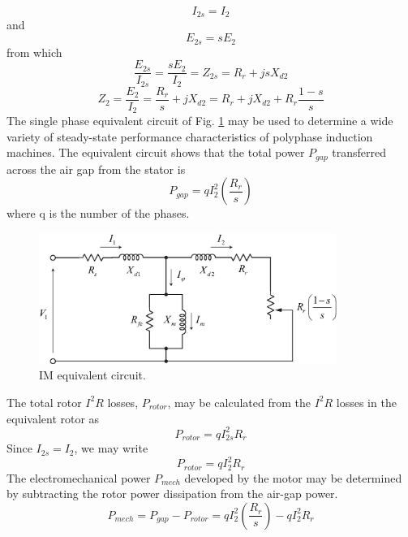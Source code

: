 \documentclass[11pt,a4paper,oneside]{book}
\numberwithin{equation}{section}
\theoremstyle{it}
\theoremstyle{definition}
\begin{document}
\begin{equation} \label{eq8}
	I_{2s} = I_{2}
\end{equation}
and
\begin{equation} \label{eq9}
	E_{2s} = sE_{2}
\end{equation}
from which
\begin{equation} \label{eq10}
	\frac{E_{2s}}{I_{2s}}=\frac{sE_2}{I_2}=Z_{2s}=R_r+jsX_{d2}
\end{equation}
\begin{equation} \label{eq11}
	Z_{2}=\frac{E_2}{I_2}=\frac{R_r}{s}+jX_{d2}=R_r+jX_{d2}+R_r\frac{1-s}{s}
\end{equation}
The single phase equivalent circuit of Fig. \ref{equivalent_circuit} may be used to determine a wide variety of steady-state performance characteristics of polyphase induction machines. The equivalent circuit shows that the total power $P_{gap}$ transferred across the air gap from the stator is
\begin{equation} \label{eq12}
	P_{gap}= q I_2^2 \left( \frac{R_r}{s} \right)
\end{equation}
where q is the number of the phases.
\begin{figure}[H]
	\centering
	\includegraphics[width = 275pt, keepaspectratio]{figures/equivalent_circuit.eps}
	\captionsetup{width=0.5\textwidth, font=small}		
	\caption{IM equivalent circuit.}
	\label{equivalent_circuit} 
\end{figure}
The total rotor $I^2R$ losses, $P_{rotor}$, may be calculated from the $I^2R$ losses in the equivalent rotor as
\begin{equation} \label{eq13}
	P_{rotor}= q I_{2s}^2 R_r
\end{equation}
Since $I_{2s}=I_2$, we may write 
\begin{equation} \label{eq14}
	P_{rotor}= q I_{2}^2 R_r
\end{equation}
The electromechanical power $P_{mech}$ developed by the motor may be determined by subtracting the rotor power dissipation from the air-gap power.
\begin{equation} \label{eq15}
	P_{mech} = P_{gap} - P_{rotor} = q I_{2}^2 \left( \frac{R_r}{s} \right) - q I_{2}^2 R_r
\end{equation} 
\end{document}
